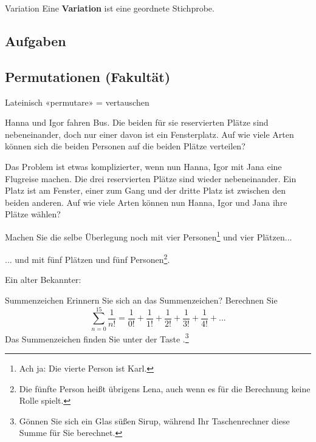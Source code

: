 \begin{definition}{Variation}{}
Eine \textbf{Variation} ist eine geordnete Stichprobe.
\end{definition}

\subsection*{Aufgaben}
\newpage


\subsection{Permutationen (Fakultät)}
Lateinisch «permutare» = vertauschen

Hanna und Igor fahren Bus. Die beiden für sie reservierten Plätze sind
nebeneinander, doch nur einer davon ist ein Fensterplatz. Auf wie
viele Arten können sich die beiden Personen auf die beiden Plätze
verteilen?


Das Problem ist etwas komplizierter, wenn nun Hanna, Igor mit Jana
eine Flugreise machen. Die drei reservierten Plätze sind wieder
nebeneinander. Ein Platz ist am Fenster, einer zum Gang und der dritte
Platz ist zwischen den beiden anderen. Auf wie viele Arten können nun
Hanna, Igor und Jana ihre Plätze wählen?


Machen Sie die selbe Überlegung noch mit vier Personen\footnote{Ach ja: Die vierte Person ist Karl.} und vier
Plätzen...


... und mit fünf Plätzen und fünf Personen\footnote{Die fünfte Person heißt übrigens Lena, auch wenn es für die Berechnung keine Rolle spielt.}.

\newpage

Ein alter Bekannter:

\begin{bemerkung}{Summenzeichen}{}
Erinnern Sie sich an das Summenzeichen? Berechnen
Sie $$\sum_{n=0}^{15}\frac{1}{n!} = \frac{1}{0!} + \frac{1}{1!}
+ \frac{1}{2!} + \frac{1}{3!} + \frac{1}{4!} + ...$$ Das Summenzeichen finden Sie unter
der Taste .\footnote{Gönnen Sie sich
ein Glas süßen Sirup, während Ihr Taschenrechner diese Summe für Sie berechnet.}
\end{bemerkung}

